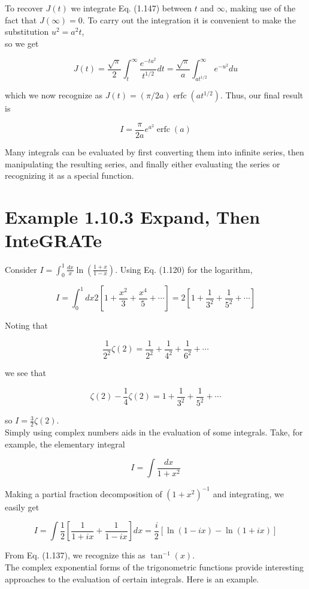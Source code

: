 \documentclass[10pt]{article}
\begin{document}
To recover $J(t)$ we integrate Eq. (1.147) between $t$ and $\infty$, making use of the fact that $J(\infty)=0$. To carry out the integration it is convenient to make the substitution $u^{2}=a^{2} t$,\\
so we get

$$
J(t)=\frac{\sqrt{\pi}}{2} \int_{t}^{\infty} \frac{e^{-t a^{2}}}{t^{1 / 2}} d t=\frac{\sqrt{\pi}}{a} \int_{a t^{1 / 2}}^{\infty} e^{-u^{2}} d u
$$

which we now recognize as $J(t)=(\pi / 2 a) \operatorname{erfc}\left(a t^{1 / 2}\right)$. Thus, our final result is

$$
I=\frac{\pi}{2 a} e^{a^{2}} \operatorname{erfc}(a)
$$

Many integrals can be evaluated by first converting them into infinite series, then manipulating the resulting series, and finally either evaluating the series or recognizing it as a special function.

\section*{Example 1.10.3 Expand, Then InteGRATe}
Consider $I=\int_{0}^{1} \frac{d x}{x} \ln \left(\frac{1+x}{1-x}\right)$. Using Eq. (1.120) for the logarithm,

$$
I=\int_{0}^{1} d x 2\left[1+\frac{x^{2}}{3}+\frac{x^{4}}{5}+\cdots\right]=2\left[1+\frac{1}{3^{2}}+\frac{1}{5^{2}}+\cdots\right]
$$

Noting that

$$
\frac{1}{2^{2}} \zeta(2)=\frac{1}{2^{2}}+\frac{1}{4^{2}}+\frac{1}{6^{2}}+\cdots
$$

we see that

$$
\zeta(2)-\frac{1}{4} \zeta(2)=1+\frac{1}{3^{2}}+\frac{1}{5^{2}}+\cdots
$$

so $I=\frac{3}{2} \zeta(2)$.\\
Simply using complex numbers aids in the evaluation of some integrals. Take, for example, the elementary integral

$$
I=\int \frac{d x}{1+x^{2}}
$$

Making a partial fraction decomposition of $\left(1+x^{2}\right)^{-1}$ and integrating, we easily get

$$
I=\int \frac{1}{2}\left[\frac{1}{1+i x}+\frac{1}{1-i x}\right] d x=\frac{i}{2}[\ln (1-i x)-\ln (1+i x)]
$$

From Eq. (1.137), we recognize this as $\tan ^{-1}(x)$.\\
The complex exponential forms of the trigonometric functions provide interesting approaches to the evaluation of certain integrals. Here is an example.
\end{document}
